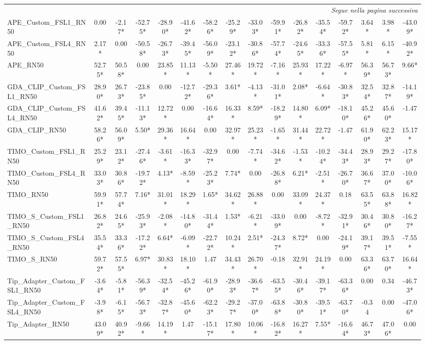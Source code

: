 \begin{scriptsize}
\begin{longtable}{l|ccccccccccccccc}
\midrule
\endhead
\midrule
\multicolumn{16}{r}{\textit{Segue nella pagina successiva}} \\
\endfoot
\bottomrule
\endlastfoot
APE\_Custom\_FSL1\_RN50 & 0.00 & -2.17* & -52.75* & -28.90* & -41.62* & -58.26* & -25.29* & -33.03* & -59.91* & -26.82* & -35.54* & -59.72* & 3.64* & 3.98* & -43.09* \\
APE\_Custom\_FSL4\_RN50 & 2.17* & 0.00 & -50.58* & -26.73* & -39.45* & -56.09* & -23.12* & -30.86* & -57.74* & -24.65* & -33.36* & -57.55* & 5.81* & 6.15* & -40.92* \\
APE\_RN50 & 52.75* & 50.58* & 0.00 & 23.85* & 11.13* & -5.50* & 27.46* & 19.72* & -7.16* & 25.93* & 17.22* & -6.97* & 56.39* & 56.73* & 9.66* \\
GDA\_CLIP\_Custom\_FSL1\_RN50 & 28.90* & 26.73* & -23.85* & 0.00 & -12.72* & -29.36* & 3.61* & -4.13* & -31.01* & 2.08* & -6.64* & -30.83* & 32.54* & 32.87* & -14.19* \\
GDA\_CLIP\_Custom\_FSL4\_RN50 & 41.62* & 39.45* & -11.13* & 12.72* & 0.00 & -16.64* & 16.33* & 8.59* & -18.29* & 14.80* & 6.09* & -18.10* & 45.26* & 45.60* & -1.47 \\
GDA\_CLIP\_RN50 & 58.26* & 56.09* & 5.50* & 29.36* & 16.64* & 0.00 & 32.97* & 25.23* & -1.65* & 31.44* & 22.72* & -1.47 & 61.90* & 62.23* & 15.17* \\
TIMO\_Custom\_FSL1\_RN50 & 25.29* & 23.12* & -27.46* & -3.61* & -16.33* & -32.97* & 0.00 & -7.74* & -34.62* & -1.53* & -10.24* & -34.43* & 28.93* & 29.27* & -17.80* \\
TIMO\_Custom\_FSL4\_RN50 & 33.03* & 30.86* & -19.72* & 4.13* & -8.59* & -25.23* & 7.74* & 0.00 & -26.88* & 6.21* & -2.51* & -26.70* & 36.67* & 37.00* & -10.06* \\
TIMO\_RN50 & 59.91* & 57.74* & 7.16* & 31.01* & 18.29* & 1.65* & 34.62* & 26.88* & 0.00 & 33.09* & 24.37* & 0.18 & 63.55* & 63.88* & 16.82* \\
TIMO\_S\_Custom\_FSL1\_RN50 & 26.82* & 24.65* & -25.93* & -2.08* & -14.80* & -31.44* & 1.53* & -6.21* & -33.09* & 0.00 & -8.72* & -32.91* & 30.46* & 30.80* & -16.27* \\
TIMO\_S\_Custom\_FSL4\_RN50 & 35.54* & 33.36* & -17.22* & 6.64* & -6.09* & -22.72* & 10.24* & 2.51* & -24.37* & 8.72* & 0.00 & -24.19* & 39.17* & 39.51* & -7.55* \\
TIMO\_S\_RN50 & 59.72* & 57.55* & 6.97* & 30.83* & 18.10* & 1.47 & 34.43* & 26.70* & -0.18 & 32.91* & 24.19* & 0.00 & 63.36* & 63.70* & 16.64* \\
Tip\_Adapter\_Custom\_FSL1\_RN50 & -3.64* & -5.81* & -56.39* & -32.54* & -45.26* & -61.90* & -28.93* & -36.67* & -63.55* & -30.46* & -39.17* & -63.36* & 0.00 & 0.34 & -46.73* \\
Tip\_Adapter\_Custom\_FSL4\_RN50 & -3.98* & -6.15* & -56.73* & -32.87* & -45.60* & -62.23* & -29.27* & -37.00* & -63.88* & -30.80* & -39.51* & -63.70* & -0.34 & 0.00 & -47.06* \\
Tip\_Adapter\_RN50 & 43.09* & 40.92* & -9.66* & 14.19* & 1.47 & -15.17* & 17.80* & 10.06* & -16.82* & 16.27* & 7.55* & -16.64* & 46.73* & 47.06* & 0.00 \\
\end{longtable}
\end{scriptsize}
